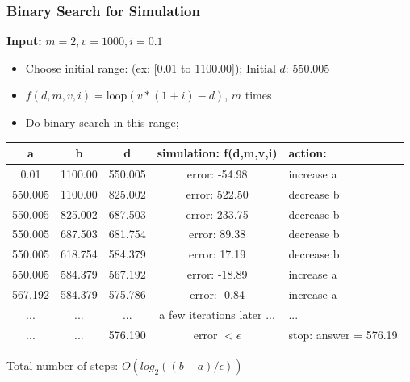 \begin{frame}
  \frametitle{Binary Search for Simulation}
{\bf Input:} $m = 2, v = 1000, i = 0.1$\bigskip

\begin{itemize}
  \item Choose initial range: (ex: [0.01 to 1100.00]); Initial $d$: 550.005
  \item $f(d,m,v,i) = \text{loop}(v*(1+i) - d)$, $m$ times
  \item Do binary search in this range;
\end{itemize}
\bigskip

{\smaller
\begin{tabular}{c|c|c|c|l}
 a & b & d & simulation: f(d,m,v,i) & action: \\
 \hline
 0.01 & 1100.00 & 550.005 & error: -54.98 & increase a\\
 550.005 & 1100.00 & 825.002 & error: 522.50 & decrease b\\
 550.005 & 825.002 & 687.503 & error: 233.75 & decrease b\\
 550.005 & 687.503 & 681.754 & error: 89.38 & decrease b\\
 550.005 & 618.754 & 584.379 & error: 17.19 & decrease b\\
 550.005 & 584.379 & 567.192 & error: -18.89 & increase a\\
 567.192 & 584.379 & 575.786 & error: -0.84 & increase a\\
 ... & ... & ... & a few iterations later ... & ...\\
 ... & ... & 576.190 & error $< \epsilon$ & stop: answer = 576.19\\
\end{tabular}}
\bigskip

Total number of steps: $O(log_2((b-a)/\epsilon))$
\end{frame}

%
%
%

